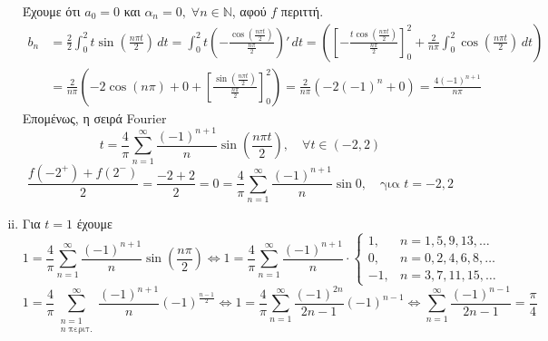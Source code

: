 \documentclass[a4paper,table]{report}
\begin{document}
\begin{solution}
\begin{enumerate}[i)]
      Έχουμε ότι $ a_{0}=0 $ και $α_{n}=0, \; \forall n \in \mathbb{N} $, 
      αφού $f$ περιττή.  
      \begin{align*}
        b_{n} &= \frac{2}{2} \int _{0}^{2} t \sin{\left(\frac{n \pi t}{2}\right)}
        \,{dt} = \int _{0}^{2} t \left(-
        \frac{\cos{(\frac{n \pi t}{2})}}{\frac{n \pi}{2}}\right)' \,{dt} =
        \left(\left[- \frac{t \cos{(\frac{n \pi t}{2})}}{\frac{n \pi}{2}}
          \right]_{0}^{2} + \frac{2}{n \pi}\int _{0}^{2}
        \cos{\left(\frac{n \pi t}{2}\right)} \,{dt}\right) \\
              &= \frac{2}{n \pi} \left( -2 \cos{(n \pi)} + 0 + 
                \left[\frac{\sin{(\frac{n \pi t}{2})}}{\frac{n \pi}{2}}
              \right]_{0}^{2}\right) = \frac{2}{n \pi} \left(-2 (-1)^{n} + 0\right) = 
              \frac{4 (-1)^{n+1}}{n \pi} 
      \end{align*}
      Επομένως, η σειρά \textlatin{Fourier}
      \[
        t = \frac{4}{\pi} \sum_{n=1}^{\infty} \frac{(-1)^{n+1}}{n} \sin{\left(\frac{n \pi t}{2}\right)}, 
        \quad \forall t \in (-2,2)
      \] 
      \[
        \frac{f(-2^{+})+ f(2^{-})}{2} = \frac{-2 + 2}{2} = 0 = \frac{4}{\pi}
        \sum_{n=1}^{\infty} \frac{(-1)^{n+1}}{n} \sin{0}, \quad \text{για } t = -2,2
      \] 
    \item 
      Για $ t=1 $ έχουμε
      \[
        1 = \frac{4}{\pi} \sum_{n=1}^{\infty} \frac{(-1)^{n+1}}{n}\sin{\left( \frac{n
        \pi}{2} \right)} \Leftrightarrow 
        1 = \frac{4}{\pi} \sum_{n=1}^{\infty} \frac{(-1)^{n+1}}{n} \cdot 
        \begin{cases}
          1, & n=1,5,9,13,\ldots \\
          0, &n=0,2,4,6,8,\ldots \\
          -1, & n=3,7,11,15,\ldots 
        \end{cases}
      \] 
      \[
        1 = \frac{4}{\pi} \sum_{\substack{n=1 \\ n \; \text{περιτ.}}}^{\infty} 
        \frac{(-1)^{n+1}}{n} (-1)^{\frac{n-1}{2}} \Leftrightarrow 1 = \frac{4}{\pi}
        \sum_{n=1}^{\infty} \frac{(-1)^{2n}}{2n-1} (-1)^{n-1}
        \Leftrightarrow 
        \sum_{n=1}^{\infty} \frac{(-1)^{n-1}}{2n-1} = \frac{\pi}{4}
      \] 
  \end{enumerate}
\end{solution}
\end{document}
